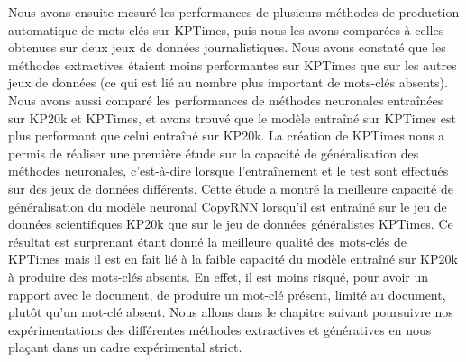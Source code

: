 Nous avons ensuite mesuré les performances de plusieurs méthodes de production automatique de mots-clés sur KPTimes, puis nous les avons comparées à celles obtenues sur deux jeux de données journalistiques.
Nous avons constaté que les méthodes extractives étaient moins performantes sur KPTimes que sur les autres jeux de données (ce qui est lié au nombre plus important de mots-clés absents).
Nous avons aussi comparé les performances de méthodes neuronales entraînées sur KP20k et KPTimes, et avons trouvé que le modèle entraîné sur KPTimes est plus performant que celui entraîné sur KP20k.
La création de KPTimes nous a permis de réaliser une première étude sur la capacité de généralisation des méthodes neuronales, c'est-à-dire lorsque l'entraînement et le test sont effectués sur des jeux de données différents.
Cette étude a montré la meilleure capacité de généralisation du modèle neuronal CopyRNN lorsqu'il est entraîné sur le jeu de données scientifiques KP20k que sur le jeu de données généralistes KPTimes.
%
Ce résultat est surprenant étant donné la meilleure qualité des mots-clés de KPTimes mais il est en fait lié à la faible capacité du modèle entraîné sur KP20k à produire des mots-clés absents.
En effet, il est moins risqué, pour avoir un rapport avec le document, de produire un mot-clé présent, limité au document, plutôt qu'un mot-clé absent.
Nous allons dans le chapitre suivant poursuivre nos expérimentations des différentes méthodes extractives et génératives en nous plaçant dans un cadre expérimental strict.



